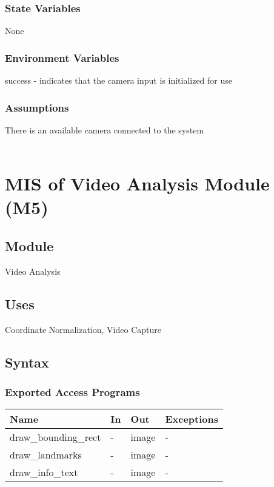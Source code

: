\documentclass[12pt, titlepage]{article}
\begin{document}
\subsubsection{State Variables}

None\\

\subsubsection{Environment Variables}

success - indicates that the camera input is initialized for use\\

\subsubsection{Assumptions}

There is an available camera connected to the system\\

~\newpage

\section{MIS of Video Analysis Module (M5)} \label{M5}

\subsection{Module}

Video Analysis\\

\subsection{Uses}

Coordinate Normalization, Video Capture\\

\subsection{Syntax}

\subsubsection{Exported Access Programs}

\begin{center}
\begin{tabular}{p{5cm} p{4cm} p{4cm} p{2cm}}
\hline
\textbf{Name} & \textbf{In} & \textbf{Out} & \textbf{Exceptions} \\
\hline
draw\_bounding\_rect & - & image & - \\
draw\_landmarks & - & image & - \\
draw\_info\_text & - & image & - \\
\hline
\end{tabular}
\end{center}
\end{document}
